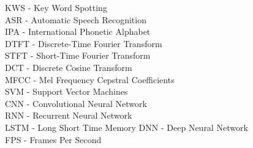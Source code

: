 
KWS - Key Word Spotting\\
ASR - Automatic Speech Recognition\\
IPA - International Phonetic Alphabet\\

DTFT - Discrete-Time Fourier Transform\\
STFT - Short-Time Fourier Transform\\
DCT - Discrete Cosine Transform\\
MFCC - Mel Frequency Cepstral Coefficients\\

SVM - Support Vector Machines\\

CNN - Convolutional Neural Network\\
RNN - Recurrent Neural Network\\
LSTM - Long Short Time Memory
DNN - Deep Neural Network\\

FPS - Frames Per Second\\